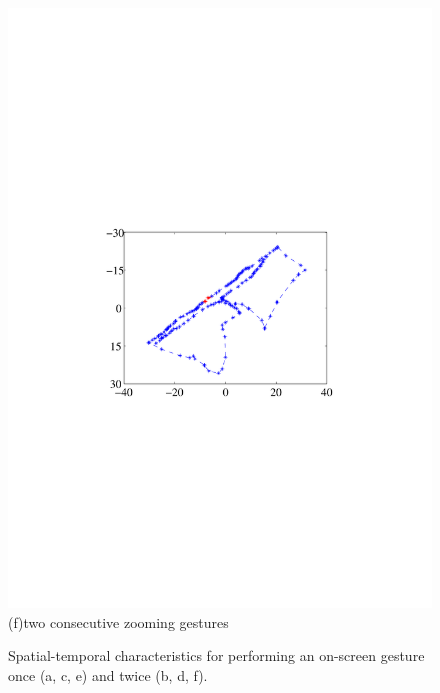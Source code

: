 \begin{figure}[!t]
{\begin{minipage}[t]{0.19\textwidth}
            \includegraphics[width=\textwidth]{fig/gesture-distinction6.pdf}\\
            \centering  (f)two consecutive zooming gestures
            \end{minipage}
        }
        \caption{Spatial-temporal characteristics for performing an on-screen gesture once (a, c, e) and twice (b, d, f).}
        \label{fig:gesture-distinction}
    \end{figure}

